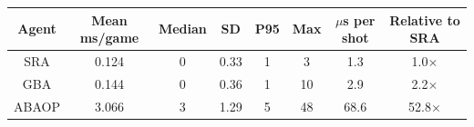 \begin{tabular}{|c|c|c|c|c|c|c|c|}
\hline
\rowcolor{blue!20}
Agent & Mean ms/game & Median & SD & P95 & Max & $\mu$s per shot & Relative to SRA \\ \hline
SRA & 0.124 & 0 & 0.33 & 1 & 3 & 1.3 & 1.0$\times$ \\ \hline
GBA & 0.144 & 0 & 0.36 & 1 & 10 & 2.9 & 2.2$\times$ \\ \hline
ABAOP & 3.066 & 3 & 1.29 & 5 & 48 & 68.6 & 52.8$\times$ \\ \hline
\end{tabular}
